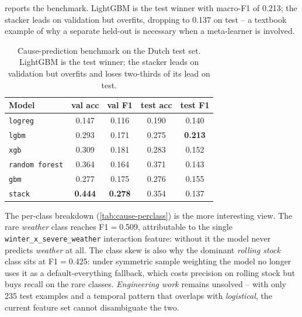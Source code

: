  reports the benchmark. LightGBM is the test winner with macro-F1 of \num{0.213}; the stacker leads on validation but overfits, dropping to \num{0.137} on test -- a textbook example of why a separate held-out is necessary when a meta-learner is involved.

\begin{table}[H]
    \centering
    \caption{Cause-prediction benchmark on the Dutch test set. LightGBM is the test winner; the stacker leads on validation but overfits and loses two-thirds of its lead on test.}
    \label{tab:cause-results}
    \small
    \begin{tabular}{l S[table-format=1.3] S[table-format=1.3] S[table-format=1.3] S[table-format=1.3]}
        \toprule
        Model & {val acc} & {val F1} & {test acc} & {test F1} \\
        \midrule
        \texttt{logreg}        & 0.147 & 0.116 & 0.190 & 0.140 \\
        \texttt{lgbm}          & 0.293 & 0.171 & 0.275 & {\bfseries 0.213} \\
        \texttt{xgb}           & 0.309 & 0.181 & 0.283 & 0.152 \\
        \texttt{random forest} & 0.364 & 0.164 & 0.371 & 0.143 \\
        \texttt{gbm}           & 0.277 & 0.175 & 0.276 & 0.155 \\
        \texttt{stack}         & {\bfseries 0.444} & {\bfseries 0.278} & 0.354 & 0.137 \\
        \bottomrule
    \end{tabular}
\end{table}

The per-class breakdown (\cref{tab:cause-perclass}) is the more interesting view. The rare \emph{weather} class reaches F1$=$\num{0.509}, attributable to the single \texttt{winter\_x\_severe\_weather} interaction feature: without it the model never predicts \emph{weather} at all. The class skew is also why the dominant \emph{rolling stock} class sits at F1$=$\num{0.425}: under symmetric sample weighting the model no longer uses it as a default-everything fallback, which costs precision on rolling stock but buys recall on the rare classes. \emph{Engineering work} remains unsolved -- with only 235 test examples and a temporal pattern that overlaps with \emph{logistical}, the current feature set cannot disambiguate the two.

